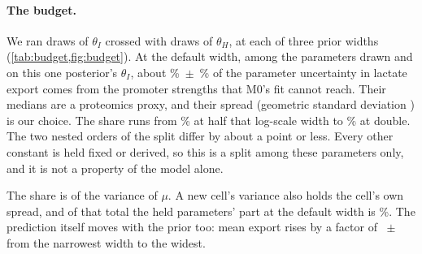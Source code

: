 \paragraph{The budget.} We ran  draws of $\theta_I$ crossed with
 draws of $\theta_H$, at each of three prior widths
(\cref{tab:budget,fig:budget}). At the default width, among the 
parameters drawn and on this one posterior's $\theta_I$, about
\%~$\pm$~\% of the parameter uncertainty in
lactate export comes from the  promoter strengths that M0's fit cannot
reach. Their medians are a proteomics proxy, and their spread (geometric standard
deviation ) is our choice. The share runs from
\% at half that log-scale width to \% at double. The
two nested orders of the split differ by about a point or less. Every other constant is
held fixed or derived, so this is a split among these  parameters
only, and it is not a property of the model alone.

The share is of the variance of $\mu$. A new cell's variance also holds the cell's own
spread, and of that total the held parameters' part at the default width is
\%. The prediction itself moves with the prior too: mean export
rises by a factor of ~$\pm$~ from the
narrowest width to the widest.

